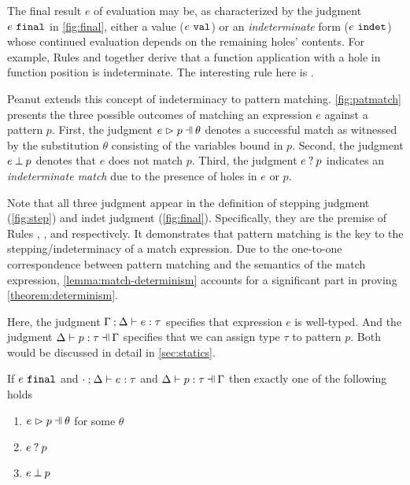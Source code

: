 The final result $e$ of evaluation may be, as characterized by the judgment $e ~\mathtt{final}$ in \autoref{fig:final}, either a value ($e ~\mathtt{val}$) or an \emph{indeterminate} form ($e ~\mathtt{indet}$) whose continued evaluation depends on the remaining holes' contents. For example, Rules \IAp and \IEHole together derive that a function application with a hole in function position is indeterminate. The interesting rule here is \IMatch.



Peanut extends this concept of indeterminacy to pattern matching.
\autoref{fig:patmatch} presents the three possible outcomes of matching an expression $e$ against a pattern $p$. 
First, the judgment $\hpatmatch{e}{p}{\theta}$ denotes a successful match as witnessed by the substitution $\theta$ consisting of the variables bound in $p$. Second, the judgment $e \mathbin{\bot} p$ denotes that $e$ does not match $p$. Third, the judgment $e \mathbin{?} p$ indicates an \emph{indeterminate match} due to the presence of holes in $e$ or $p$. 

Note that all three judgment appear in the definition of stepping judgment (\autoref{fig:step}) and indet judgment (\autoref{fig:final}). Specifically, they are the premise of Rules \ITSuccMatch, \ITFailMatch, and \IMatch respectively. It demonstrates that pattern matching is the key to the stepping/indeterminacy of a match expression.
Due to the one-to-one correspondence between pattern matching and the semantics of the match expression, \autoref{lemma:match-determinism} accounts for a significant part in proving \autoref{theorem:determinism}.

Here, the judgment $\Gamma \mathbin{;} \Delta \vdash e : \tau$ specifies that expression $e$ is well-typed. And the judgment $\hpattyp{p}{\tau}{\Gamma}{\Delta}$ specifies that we can assign type $\tau$ to pattern $p$. Both would be discussed in detail in \autoref{sec:statics}.
\begin{lemma}
  \label{lemma:match-determinism}
  If $e ~\mathtt{final}$ and $\cdot \mathbin{;} \Delta \vdash e : \tau$ and $\hpattyp{p}{\tau}{\Gamma}{\Delta}$ then exactly one of the following holds
  \begin{enumerate}
    \item $\hpatmatch{e}{p}{\theta}$ for some $\theta$
    \item $e \mathbin{?} p$
    \item $e \mathbin{\bot} p$
  \end{enumerate}
\end{lemma}

